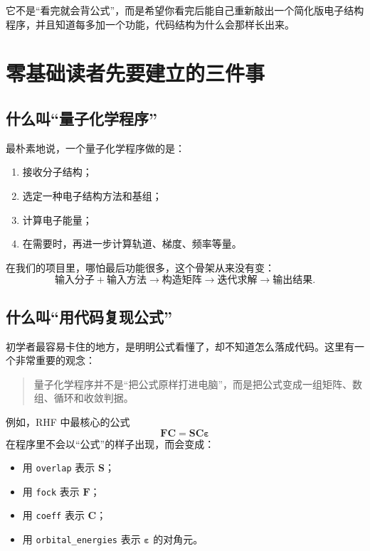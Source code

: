 \documentclass[UTF8,11pt,fontset=fandol]{ctexbook}
\begin{document}
它不是“看完就会背公式”，而是希望你看完后能自己重新敲出一个简化版电子结构程序，并且知道每多加一个功能，代码结构为什么会那样长出来。

\chapter{零基础读者先要建立的三件事}

\section{什么叫“量子化学程序”}

最朴素地说，一个量子化学程序做的是：
\begin{enumerate}[label=\arabic*.]
  \item 接收分子结构；
  \item 选定一种电子结构方法和基组；
  \item 计算电子能量；
  \item 在需要时，再进一步计算轨道、梯度、频率等量。
\end{enumerate}

在我们的项目里，哪怕最后功能很多，这个骨架从来没有变：
\begin{equation}
\text{输入分子} + \text{输入方法} \longrightarrow \text{构造矩阵} \longrightarrow \text{迭代求解} \longrightarrow \text{输出结果}.
\end{equation}

\section{什么叫“用代码复现公式”}

初学者最容易卡住的地方，是明明公式看懂了，却不知道怎么落成代码。这里有一个非常重要的观念：

\begin{quote}
量子化学程序并不是“把公式原样打进电脑”，而是把公式变成一组矩阵、数组、循环和收敛判据。
\end{quote}

例如，RHF 中最核心的公式
\begin{equation}
\mathbf{F}\mathbf{C} = \mathbf{S}\mathbf{C}\bm{\varepsilon}
\end{equation}
在程序里不会以“公式”的样子出现，而会变成：
\begin{itemize}
  \item 用 \texttt{overlap} 表示 $\mathbf{S}$；
  \item 用 \texttt{fock} 表示 $\mathbf{F}$；
  \item 用 \texttt{coeff} 表示 $\mathbf{C}$；
  \item 用 \texttt{orbital\_energies} 表示 $\bm{\varepsilon}$ 的对角元。
\end{itemize}
\end{document}

